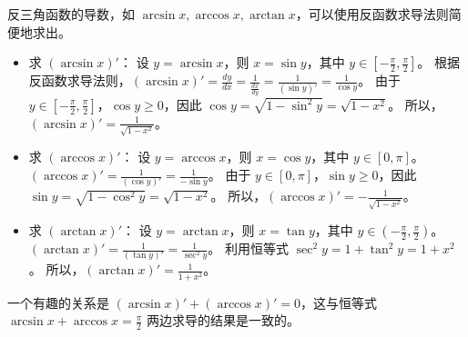 \documentclass[lang=cn,newtx,10pt,scheme=chinese]{elegantbook}
\begin{document}
\begin{example}
  反三角函数的导数，如 $\arcsin x,\arccos x,\arctan x$，可以使用反函数求导法则简便地求出。
  \begin{itemize}
    \item 求 $(\arcsin x)'$：
    设 $y = \arcsin x$，则 $x = \sin y$，其中 $y \in [-\frac{\pi}{2}, \frac{\pi}{2}]$。
    根据反函数求导法则，$(\arcsin x)' = \frac{dy}{dx} = \frac{1}{\frac{dx}{dy}} = \frac{1}{(\sin y)'} = \frac{1}{\cos y}$。
    由于 $y \in [-\frac{\pi}{2}, \frac{\pi}{2}]$，$\cos y \ge 0$，因此 $\cos y = \sqrt{1-\sin^2 y} = \sqrt{1-x^2}$。
    所以，$\displaystyle (\arcsin x)' = \frac{1}{\sqrt{1-x^2}}$。

    \item 求 $(\arccos x)'$：
    设 $y = \arccos x$，则 $x = \cos y$，其中 $y \in [0, \pi]$。
    $(\arccos x)' = \frac{1}{(\cos y)'} = \frac{1}{-\sin y}$。
    由于 $y \in [0, \pi]$，$\sin y \ge 0$，因此 $\sin y = \sqrt{1-\cos^2 y} = \sqrt{1-x^2}$。
    所以，$\displaystyle (\arccos x)' = -\frac{1}{\sqrt{1-x^2}}$。

    \item 求 $(\arctan x)'$：
    设 $y = \arctan x$，则 $x = \tan y$，其中 $y \in (-\frac{\pi}{2}, \frac{\pi}{2})$。
    $(\arctan x)' = \frac{1}{(\tan y)'} = \frac{1}{\sec^2 y}$。
    利用恒等式 $\sec^2 y = 1 + \tan^2 y = 1+x^2$。
    所以，$\displaystyle (\arctan x)' = \frac{1}{1+x^2}$。
  \end{itemize}
  一个有趣的关系是 $(\arcsin x)' + (\arccos x)' = 0$，这与恒等式 $\arcsin x + \arccos x = \frac{\pi}{2}$ 两边求导的结果是一致的。
\end{example}
\end{document}
